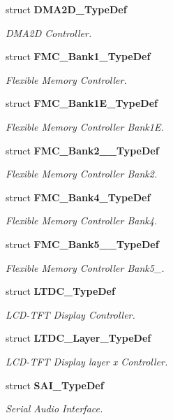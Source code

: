 \begin{DoxyCompactItemize}
struct \textbf{ D\+M\+A2\+D\+\_\+\+Type\+Def}
\begin{DoxyCompactList}\small\item\em D\+M\+A2D Controller. \end{DoxyCompactList}\item 
struct \textbf{ F\+M\+C\+\_\+\+Bank1\+\_\+\+Type\+Def}
\begin{DoxyCompactList}\small\item\em Flexible Memory Controller. \end{DoxyCompactList}\item 
struct \textbf{ F\+M\+C\+\_\+\+Bank1\+E\+\_\+\+Type\+Def}
\begin{DoxyCompactList}\small\item\em Flexible Memory Controller Bank1E. \end{DoxyCompactList}\item 
struct \textbf{ F\+M\+C\+\_\+\+Bank2\+\_\+\_\+\+Type\+Def}
\begin{DoxyCompactList}\small\item\em Flexible Memory Controller Bank2. \end{DoxyCompactList}\item 
struct \textbf{ F\+M\+C\+\_\+\+Bank4\+\_\+\+Type\+Def}
\begin{DoxyCompactList}\small\item\em Flexible Memory Controller Bank4. \end{DoxyCompactList}\item 
struct \textbf{ F\+M\+C\+\_\+\+Bank5\+\_\+\_\+\+Type\+Def}
\begin{DoxyCompactList}\small\item\em Flexible Memory Controller Bank5\+\_. \end{DoxyCompactList}\item 
struct \textbf{ L\+T\+D\+C\+\_\+\+Type\+Def}
\begin{DoxyCompactList}\small\item\em L\+C\+D-\/\+T\+FT Display Controller. \end{DoxyCompactList}\item 
struct \textbf{ L\+T\+D\+C\+\_\+\+Layer\+\_\+\+Type\+Def}
\begin{DoxyCompactList}\small\item\em L\+C\+D-\/\+T\+FT Display layer x Controller. \end{DoxyCompactList}\item 
struct \textbf{ S\+A\+I\+\_\+\+Type\+Def}
\begin{DoxyCompactList}\small\item\em Serial Audio Interface. \end{DoxyCompactList}\item 

\end{DoxyCompactItemize}
